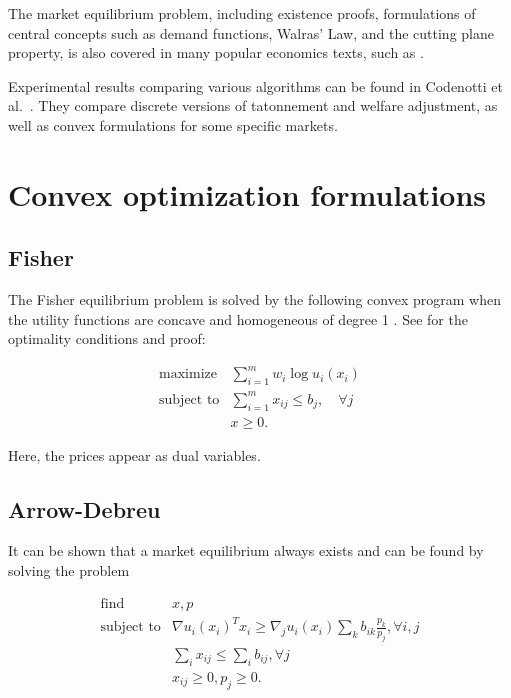 \documentclass{article}
\begin{document}
The market equilibrium problem, including existence proofs, formulations of central concepts such as demand functions, Walras' Law, and the cutting plane property, is also covered in many popular economics texts, such as \cite{varian1992microeconomic, mas1995microeconomic, luenberger1995microeconomic, kreps1990course}.

Experimental results comparing various algorithms can be found in Codenotti et al.\ \cite{codenotti2008experimental}. They compare discrete versions of tatonnement and welfare adjustment, as well as convex formulations for some specific markets.


\section{Convex optimization formulations}


\subsection{Fisher}

The Fisher equilibrium problem is solved by the following convex program when the utility functions are concave and homogeneous of degree 1 \cite{eisenberg1959consensus, gale1960theory, eisenberg1961aggregation}.
See \cite[Section~6.2]{nisan2007algorithmic} for the optimality conditions and proof:

\[
\begin{array}{ll}
\mbox{maximize} & \sum_{i=1}^m w_i \log u_i(x_i) \\
\mbox{subject to} & \sum_{i=1}^m x_{ij} \leq b_j, \quad \forall j\\
& x \geq 0.
\end{array}
\]

Here, the prices appear as dual variables.

\subsection{Arrow-Debreu}
It can be shown that a market equilibrium always exists and can be found by solving the problem

\[
\begin{array}{ll}
\mbox{find} & x, p \\
\mbox{subject to} & \nabla u_i(x_i)^T x_i \geq  \nabla_j u_i(x_i) \sum_k b_{ik} \frac{p_k}{p_j}, \forall i,j\\
& \sum_i x_{ij} \leq \sum_i b_{ij}, \forall j\\
& x_{ij} \geq 0, p_j \geq 0.
\end{array}
\]
\end{document}
